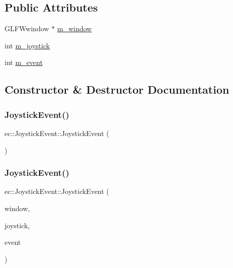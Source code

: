 \subsection*{Public Attributes}
\begin{DoxyCompactItemize}
\item 
G\+L\+F\+Wwindow $\ast$ \mbox{\hyperlink{structec_1_1_joystick_event_a9b108de0a7db9268dd11642a203ef816}{m\+\_\+window}}
\item 
int \mbox{\hyperlink{structec_1_1_joystick_event_a415b6d2d801b41db8f3dee6b2be35448}{m\+\_\+joystick}}
\item 
int \mbox{\hyperlink{structec_1_1_joystick_event_acf4361edcb473cbf0567137224c86f2a}{m\+\_\+event}}
\end{DoxyCompactItemize}


\subsection{Constructor \& Destructor Documentation}
\mbox{\label{structec_1_1_joystick_event_a04113c84c127415b3937c214b3e6eb92}} 
\subsubsection{\texorpdfstring{Joystick\+Event()}{JoystickEvent()}\hspace{0.1cm}{\footnotesize\ttfamily [1/2]}}
{\footnotesize\ttfamily ec\+::\+Joystick\+Event\+::\+Joystick\+Event (\begin{DoxyParamCaption}{ }\end{DoxyParamCaption})\hspace{0.3cm}{\ttfamily [explicit]}}

\mbox{\label{structec_1_1_joystick_event_ac922516c15cb953f16fe666a796ab26e}} 
\subsubsection{\texorpdfstring{Joystick\+Event()}{JoystickEvent()}\hspace{0.1cm}{\footnotesize\ttfamily [2/2]}}
{\footnotesize\ttfamily ec\+::\+Joystick\+Event\+::\+Joystick\+Event (\begin{DoxyParamCaption}\item[{G\+L\+F\+Wwindow $\ast$}]{window,  }\item[{const int}]{joystick,  }\item[{const int}]{event }\end{DoxyParamCaption})\hspace{0.3cm}{\ttfamily [explicit]}}

